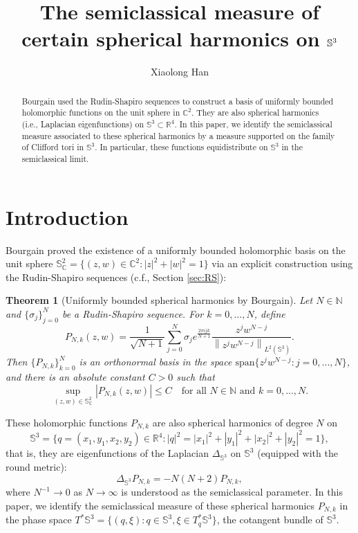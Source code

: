 \documentclass[12pt,reqno]{amsart}
\title{The semiclassical measure of certain spherical harmonics on $\Sb^3$}
\author{Xiaolong Han}
\newcommand\C{\mathbb{C}}
\newcommand\N{\mathbb{N}}
\newcommand\R{\mathbb{R}}
\newcommand\Sb{\mathbb{S}}
\newcommand\Span{\mathrm{span}}
\theoremstyle{plain}
\newtheorem{thm}{Theorem}
\theoremstyle{remark}
\numberwithin{equation}{section}
\begin{document}
\maketitle

\begin{abstract}
Bourgain \cite{B1} used the Rudin-Shapiro sequences to construct a basis of uniformly bounded holomorphic functions on the unit sphere in $\C^2$. They are also spherical harmonics (i.e., Laplacian eigenfunctions) on $\Sb^3\subset\R^4$. In this paper, we identify the semiclassical measure associated to these spherical harmonics by a measure supported on the family of Clifford tori in $\Sb^3$. In particular, these functions equidistribute on $\Sb^3$ in the semiclassical limit. 
\end{abstract}



\section{Introduction}
Bourgain \cite{B1} proved the existence of a uniformly bounded holomorphic basis on the unit sphere $\Sb_\C^2=\{(z,w)\in\C^2:|z|^2+|w|^2=1\}$ via an explicit construction using the Rudin-Shapiro sequences (c.f., Section \ref{sec:RS}): 
\begin{thm}[Uniformly bounded spherical harmonics by Bourgain]
Let $N\in\N$ and $\{\sigma_j\}_{j=0}^N$ be a Rudin-Shapiro sequence. For $k=0,...,N$, define
\begin{equation}\label{eq:P}
P_{N,k}(z,w)=\frac{1}{\sqrt{N+1}}\sum_{j=0}^N\sigma_je^{\frac{2\pi ijk}{N+1}}\frac{z^jw^{N-j}}{\left\|z^jw^{N-j}\right\|_{L^2(\Sb^3)}}.
\end{equation}
Then $\{P_{N,k}\}_{k=0}^N$ is an orthonormal basis in the space $\Span\{z^jw^{N-j}:j=0,...,N\}$, and there is an absolute constant $C>0$ such that
$$\sup_{(z,w)\in\Sb_\C^2}\left|P_{N,k}(z,w)\right|\le C\quad\text{for all }N\in\N\text{ and }k=0,...,N.$$
\end{thm}

These holomorphic functions $P_{N,k}$ are also spherical harmonics of degree $N$ on 
$$\Sb^3=\{q=(x_1,y_1,x_2,y_2)\in\R^4:|q|^2=|x_1|^2+|y_1|^2+|x_2|^2+|y_2|^2=1\},$$
that is, they are eigenfunctions of the Laplacian $\Delta_{\Sb^3}$ on $\Sb^3$ (equipped with the round metric):
\begin{equation}\label{eq:efn}
\Delta_{\Sb^3}P_{N,k}=-N(N+2)P_{N,k},
\end{equation}
where $N^{-1}\to0$ as $N\to\infty$ is understood as the semiclassical parameter. In this paper, we identify the semiclassical measure of these spherical harmonics $P_{N,k}$ in the phase space $T^*\Sb^3=\{(q,\xi):q\in\Sb^3,\xi\in T^*_q\Sb^3\}$, the cotangent bundle of $\Sb^3$. 
\end{document}
